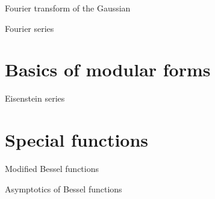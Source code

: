 
\begin{theorem}
    Fourier transform of the Gaussian
\end{theorem}


\begin{definition}
    Fourier series
\end{definition}

\section{Basics of modular forms}

\begin{definition}
    Eisenstein series
\end{definition}

\section{Special functions}

\begin{definition}
    Modified Bessel functions
\end{definition}

\begin{theorem}
    Asymptotics of Bessel functions
\end{theorem}
